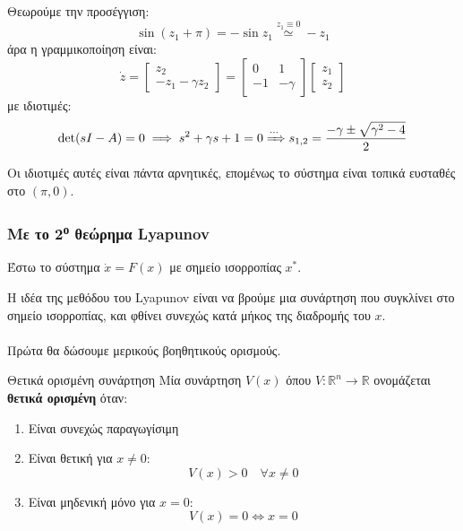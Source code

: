 \documentclass[11pt,a4paper,notitlepage,fleqn]{article}
\begin{document}
\begin{exercise}[Παράδειγμα]
    Θεωρούμε την προσέγγιση:
    \[
    \sin(z_1 + π) = -\sin z_1 \overset{z_1 \equiv 0}{\simeq} -z_1
    \]
    άρα η γραμμικοποίηση είναι:
    \[
    \dot z = \left[\begin{matrix}
    z_2 \\ -z_1-\gamma z_2
    \end{matrix}\right] = \left[\begin{matrix}
    0 & 1 \\ -1 &-\gamma
    \end{matrix}
    \right]\left[\begin{matrix}
    z_1 \\ z_2
    \end{matrix}\right]
    \]
    με ιδιοτιμές:
    \[
    \det(sI-A) = 0 \implies s^2 + \gamma s + 1 =0 \xRightarrow{\cdots} s_{1,2} = \frac{-\gamma \pm \sqrt{\gamma^2-4}}{2}
    \]
    
    Οι ιδιοτιμές αυτές είναι πάντα αρνητικές, επομένως το σύστημα είναι τοπικά ευσταθές στο \( (π,0) \).
\end{exercise}

\subsubsection{Με το 2\textsuperscript{ο} θεώρημα Lyapunov}
Έστω το σύστημα \( \dot x = F(x) \) με σημείο ισορροπίας \( x^* \).

Η ιδέα της μεθόδου του Lyapunov είναι να βρούμε μια συνάρτηση που συγκλίνει
στο σημείο ισορροπίας, και φθίνει συνεχώς κατά μήκος της διαδρομής του \( x \).

\paragraph{}
Πρώτα θα δώσουμε μερικούς βοηθητικούς ορισμούς.

\begin{defn}{Θετικά ορισμένη συνάρτηση}{}
	Μία συνάρτηση \( V(x) \) όπου \( V: \mathbb R^n \to \mathbb R \) ονομάζεται \textbf{θετικά
		ορισμένη} όταν:
	\begin{enumerate}
		\item Είναι συνεχώς παραγωγίσιμη
		\item Είναι θετική για \( x\neq 0 \):
		\[
		V(x) > 0 \quad \forall x\neq 0
		\]
		\item Είναι μηδενική μόνο για \( x=0 \):
		\[
		V(x) = 0 \iff x=0
		\]
	\end{enumerate}
\end{defn}
\end{document}
